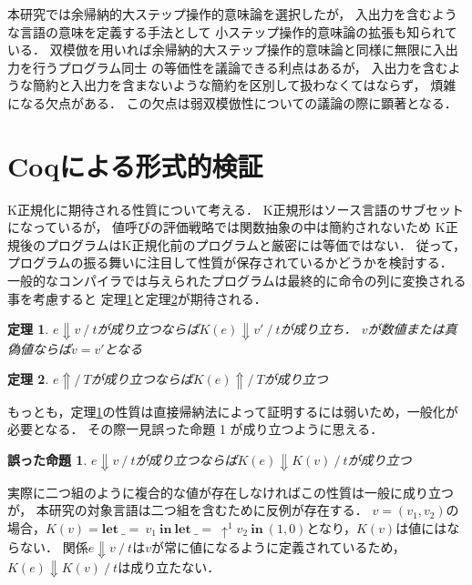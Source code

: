 \documentclass[T]{compsoft}
\newcommand{\keyword}[1]{\mathbf{#1}}
\newcommand{\LET}{\keyword{let}}
\newcommand{\IN}{\keyword{in}}
\newcommand{\theoremname}{定理}
\newtheorem{theorem}{\theoremname}
\newcommand{\wrongpropositioname}{誤った命題}
\newtheorem{wrongproposition}{\wrongpropositioname}
\begin{document}
本研究では余帰納的大ステップ操作的意味論を選択したが，
入出力を含むような言語の意味を定義する手法として
小ステップ操作的意味論の拡張も知られている．
双模倣を用いれば余帰納的大ステップ操作的意味論と同様に無限に入出力を行うプログラム同士
の等価性を議論できる利点はあるが，
入出力を含むような簡約と入出力を含まないような簡約を区別して扱わなくてはならず，
煩雑になる欠点がある．
この欠点は弱双模倣性についての議論の際に顕著となる．

\section{Coqによる形式的検証}
K正規化に期待される性質について考える．
K正規形はソース言語のサブセットになっているが，
値呼びの評価戦略では関数抽象の中は簡約されないため
K正規後のプログラムはK正規化前のプログラムと厳密には等価ではない．
従って，プログラムの振る舞いに注目して性質が保存されているかどうかを検討する．
一般的なコンパイラでは与えられたプログラムは最終的に命令の列に変換される事を考慮すると
\theoremname\ref{theorem:eval-correctness}と\theoremname\ref{theorem:diverge-correctness}が期待される．
\begin{theorem}\label{theorem:eval-correctness}
	$e\Downarrow v~/~t$が成り立つならば$K(e)\Downarrow v'~/~t$が成り立ち．
	$v$が数値または真偽値ならば$v=v'$となる
\end{theorem}
\begin{theorem}\label{theorem:diverge-correctness}
	$e\Uparrow/~T$が成り立つならば$K(e)\Uparrow/~T$が成り立つ
\end{theorem}

もっとも，\theoremname\ref{theorem:eval-correctness}の性質は直接帰納法によって証明するには弱いため，一般化が必要となる．
その際一見\wrongpropositioname
1 %
が成り立つように思える．
\begin{wrongproposition}\label{wrongproposition:wrong-lemma}
	$e\Downarrow v~/~t$が成り立つならば$K(e)\Downarrow K(v)~/~t$が成り立つ
\end{wrongproposition}
実際に二つ組のように複合的な値が存在しなければこの性質は一般に成り立つが，
本研究の対象言語は二つ組を含むために反例が存在する．
$v=(v_1,v_2)$の場合，$K(v)=\LET~\_=~v_1~\IN~\LET~\_=~\uparrow^1 v_2~\IN~(1,0)$となり，$K(v)$は値にはならない．
関係$e \Downarrow v~/~t$は$v$が常に値になるように定義されているため，
$K(e)\Downarrow K(v)~/~t$は成り立たない．
\end{document}
